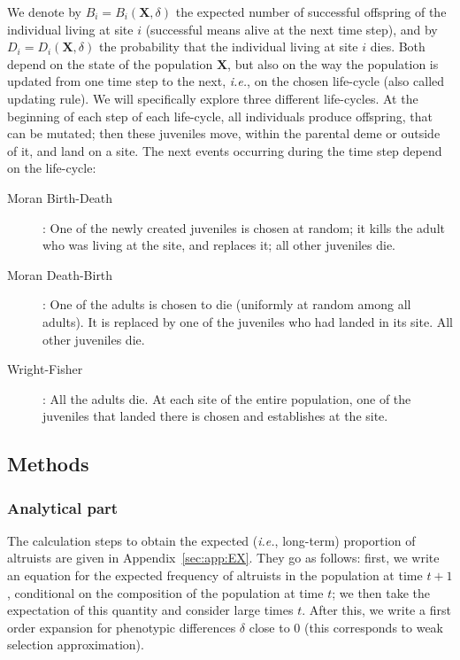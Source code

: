 \documentclass[11pt, letterpaper]{article}
\newcommand{\ie}{\textit{i.e.}}
\newcommand{\appname}[0]{Appendix}
\begin{document}
We denote by $B_i = B_i(\mathbf{X}, \delta)$ the expected number of successful offspring of the individual living at site $i$ (successful means alive at the next time step), and by $D_i = D_i(\mathbf{X}, \delta)$ the probability that the individual living at site $i$ dies. Both depend on the state of the population $\mathbf{X}$, but also on the way the population is updated from one time step to the next, \ie, on the chosen life-cycle (also called updating rule). We will specifically explore three different life-cycles. At the beginning of each step of each life-cycle, all individuals produce offspring, that can be mutated; then these juveniles move, within the parental deme or outside of it, and land on a site. The next events occurring during the time step depend on the life-cycle:
\begin{description}
\item[Moran Birth-Death]: One of the newly created juveniles is chosen at random; it kills the adult who was living at the site, and replaces it; all other juveniles die. 
\item[Moran Death-Birth]: One of the adults is chosen to die (uniformly at random among all adults). It is replaced by one of the juveniles who had landed in its site. All other juveniles die. 
\item[Wright-Fisher]: All the adults die. At each site of the entire population, one of the juveniles that landed there is chosen and establishes at the site. 
\end{description}
  
\subsection{Methods}
\subsubsection{Analytical part}

The calculation steps to obtain the expected (\ie, long-term) proportion of altruists are given in \appname~\ref{sec:app:EX}. They go as follows: first, we write an equation for the expected frequency of altruists in the population at time $t+1$, conditional on the composition of the population at time $t$; we then take the expectation of this quantity and consider large times $t$. After this, we write a first order expansion for phenotypic differences $\delta$ close to $0$ (this corresponds to weak selection approximation). 
\end{document}
